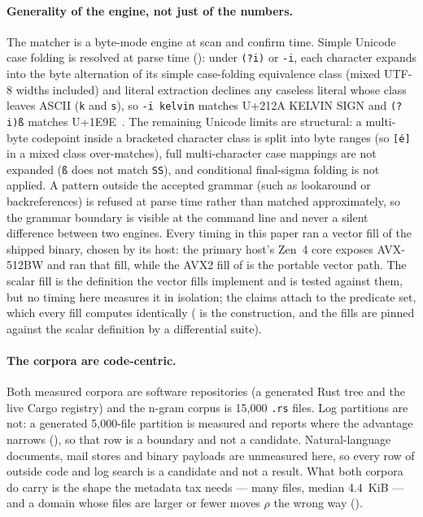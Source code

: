 \documentclass[11pt,letterpaper]{article}
\begin{document}
\paragraph{Generality of the engine, not just of the numbers.}
The matcher is a byte-mode engine at scan and confirm time. Simple Unicode
case folding is resolved at parse time (): under
\texttt{(?i)} or \texttt{-i}, each character expands into the byte
alternation of its simple case-folding equivalence class (mixed UTF-8 widths
included) and literal extraction declines any caseless literal whose class
leaves ASCII (\texttt{k} and \texttt{s}), so \texttt{-i kelvin} matches
U+212A KELVIN SIGN and \texttt{(?i)\ss} matches U+1E9E~\texttt{\SS}. The
remaining Unicode limits are structural: a multi-byte codepoint inside a
bracketed character class is split into byte ranges (so \texttt{[\'e]} in a
mixed class over-matches), full multi-character case mappings are not
expanded (\texttt{\ss} does not match \texttt{SS}), and conditional
final-sigma folding is not applied. A pattern outside the accepted grammar
(such as lookaround or backreferences) is refused at parse time rather than
matched approximately, so the grammar boundary is visible at the command
line and never a silent difference between two engines.
Every timing in this paper ran a vector fill of the shipped binary, chosen
by its host: the primary host's Zen~4 core exposes AVX-512BW and ran that
fill, while the AVX2 fill of  is the portable vector
path. The scalar fill is the definition the vector fills implement and is
tested against them, but no timing here measures it in isolation; the
claims attach to the predicate set, which every fill computes identically
( is the construction, and the fills are pinned against
the scalar definition by a differential suite).

\paragraph{The corpora are code-centric.}
Both measured corpora are software repositories (a generated Rust tree and
the live Cargo registry) and the n-gram corpus is 15{,}000 \texttt{.rs}
files. Log partitions are not: a generated 5{,}000-file partition is measured and
reports where the advantage narrows
(), so that row is a boundary and not
a candidate. Natural-language documents, mail stores and binary
payloads are unmeasured here, so every row of  outside code
and log search is a candidate and not a result. What both corpora do carry is the
shape the metadata tax needs --- many files, median 4.4~KiB --- and a
domain whose files are larger or fewer moves $\rho$ the wrong way
().
\end{document}
